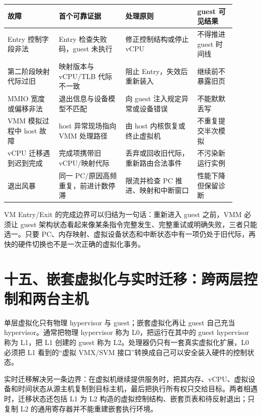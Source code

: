 
\begin{longtable}{L{0.20\linewidth}L{0.26\linewidth}L{0.29\linewidth}L{0.15\linewidth}}
\toprule
故障 & 首个可靠证据 & 处理原则 & guest 可见结果 \\
\midrule
Entry 控制字段非法 & Entry 检查失败码，guest 未执行 & 修正控制结构或停止 vCPU & 不得推进 guest 时间线 \\\tablerowrule
第二阶段映射代际过旧 & 映射版本与 vCPU/TLB 代际不一致 & 阻止 Entry，失效后重新装入 & 继续前不暴露旧页 \\\tablerowrule
MMIO 宽度或偏移非法 & 退出信息与设备模型不匹配 & 向 guest 注入规定异常或设备错误 & 不能默默丢写 \\\tablerowrule
VMM 模拟过程中 host 故障 & host 异常现场指向 VMM 处理路径 & 由 host 内核恢复或终止虚拟机 & 不重复提交半次模拟 \\\tablerowrule
vCPU 迁移遇到迟到完成 & 完成项携带旧 vCPU/映射代际 & 丢弃或回收旧代际，重新路由合法事件 & 不污染新运行实例 \\\tablerowrule
退出风暴 & 同一 PC/原因高频重复，前进计数停滞 & 限流并检查 PC 推进、映射和中断窗口 & 性能下降但保留诊断 \\
\bottomrule
\end{longtable}

VM Entry/Exit 的完成边界可以归结为一句话：重新进入 guest 之前，VMM 必须让 guest 架构状态看起来像某条指令完整发生、完整重试或明确失败，三者只能选一。只要 PC、内存映射、虚拟设备状态和中断状态中有一项仍处于旧代际，再快的硬件切换也不是一次正确的虚拟化事务。
\section{十五、嵌套虚拟化与实时迁移：跨两层控制和两台主机}

单层虚拟化只有物理 hypervisor 与 guest；嵌套虚拟化再让 guest 自己充当 hypervisor。通常把物理 hypervisor 称为 L0，把运行在其中的 guest hypervisor 称为 L1，把 L1 创建的 guest 称为 L2。处理器仍只有一套真实虚拟化扩展，L0 必须把 L1 看到的“虚拟 VMX/SVM 接口”转换成自己可以安全装入硬件的控制状态。\cite{linux-nested-vmx}

实时迁移解决另一条边界：在虚拟机继续提供服务时，把其内存、vCPU、虚拟设备和时间状态从源主机复制到目标主机，最后把执行所有权只交给目标。两者相遇时，迁移状态还包括 L1 为 L2 构造的虚拟控制结构、嵌套页表和待反射退出；只复制 L2 的通用寄存器并不能重建嵌套执行环境。



